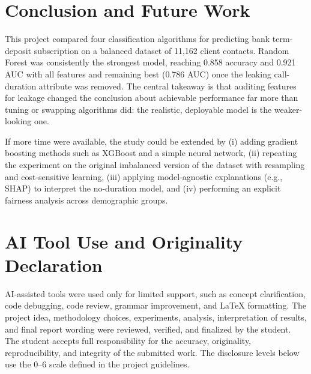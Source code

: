 \documentclass[conference]{IEEEtran}
\begin{document}
	\section{Conclusion and Future Work}
	\label{sec:conclusion}

	This project compared four classification algorithms for predicting bank
	term-deposit subscription on a balanced dataset of 11,162 client contacts.
	Random Forest was consistently the strongest model, reaching 0.858 accuracy and
	0.921 AUC with all features and remaining best (0.786 AUC) once the leaking
	call-duration attribute was removed. The central takeaway is that auditing
	features for leakage changed the conclusion about achievable performance far
	more than tuning or swapping algorithms did: the realistic, deployable model is
	the weaker-looking one.

	If more time were available, the study could be extended by (i) adding gradient
	boosting methods such as XGBoost and a simple neural network, (ii) repeating
	the experiment on the original imbalanced version of the dataset with
	resampling and cost-sensitive learning, (iii) applying model-agnostic
	explanations (e.g., SHAP) to interpret the no-duration model, and (iv)
	performing an explicit fairness analysis across demographic groups.

	\section*{AI Tool Use and Originality Declaration}
	\label{sec:ai_declaration}

	AI-assisted tools were used only for limited support, such as concept
	clarification, code debugging, code review, grammar improvement, and LaTeX
	formatting. The project idea, methodology choices, experiments, analysis,
	interpretation of results, and final report wording were reviewed, verified,
	and finalized by the student. The student accepts full responsibility for the
	accuracy, originality, reproducibility, and integrity of the submitted work.
	The disclosure levels below use the 0--6 scale defined in the project
	guidelines.
\end{document}
